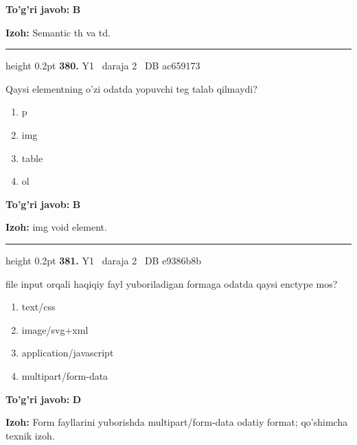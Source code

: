 \documentclass[10pt,a4paper,oneside]{article}
\begin{document}
\begin{tcolorbox}[enhanced,breakable,colback=teal!4,colframe=teal!45!black,boxrule=0.45pt,arc=1.2mm,left=2.8mm,right=2.8mm,top=2mm,bottom=2mm,before skip=2mm,after skip=2mm]
\textbf{\color{teal}To'g'ri javob:} \textbf{B}
\par\smallskip
\textbf{Izoh:} Semantic th va td.
\end{tcolorbox}
\vspace{2mm}\hrule height 0.2pt \vspace{4mm}
\hypertarget{q380}{\textbf{\color{ink}380.}}  {\color{muted}\scriptsize Y1 \textbullet\ daraja 2 \textbullet\ DB ac659173}
\par
Qaysi elementning o'zi odatda yopuvchi teg talab qilmaydi?
\begin{enumerate}[label=\Alph*),leftmargin=9mm]
\item p
\item img
\item table
\item ol
\end{enumerate}
\begin{tcolorbox}[enhanced,breakable,colback=teal!4,colframe=teal!45!black,boxrule=0.45pt,arc=1.2mm,left=2.8mm,right=2.8mm,top=2mm,bottom=2mm,before skip=2mm,after skip=2mm]
\textbf{\color{teal}To'g'ri javob:} \textbf{B}
\par\smallskip
\textbf{Izoh:} img void element.
\end{tcolorbox}
\vspace{2mm}\hrule height 0.2pt \vspace{4mm}
\hypertarget{q381}{\textbf{\color{ink}381.}}  {\color{muted}\scriptsize Y1 \textbullet\ daraja 2 \textbullet\ DB e9386b8b}
\par
file input orqali haqiqiy fayl yuboriladigan formaga odatda qaysi enctype mos?
\begin{enumerate}[label=\Alph*),leftmargin=9mm]
\item text/css
\item image/svg+xml
\item application/javascript
\item multipart/form-data
\end{enumerate}
\begin{tcolorbox}[enhanced,breakable,colback=teal!4,colframe=teal!45!black,boxrule=0.45pt,arc=1.2mm,left=2.8mm,right=2.8mm,top=2mm,bottom=2mm,before skip=2mm,after skip=2mm]
\textbf{\color{teal}To'g'ri javob:} \textbf{D}
\par\smallskip
\textbf{Izoh:} Form fayllarini yuborishda multipart/form-data odatiy format; qo'shimcha texnik izoh.
\end{tcolorbox}
\end{document}
